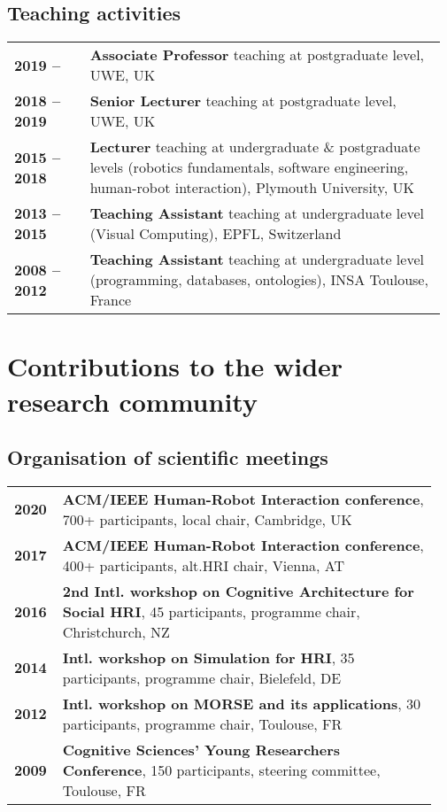 \subsection{Teaching activities}

\begin{tabular}{p{0.17\linewidth}p{0.8\linewidth}}
    \bf 2019 --  & \textbf{Associate Professor} teaching at postgraduate level, UWE, UK \\
    \bf 2018 -- 2019 & \textbf{Senior Lecturer} teaching at postgraduate level, UWE, UK \\
    \bf 2015 -- 2018 & \textbf{Lecturer} teaching at undergraduate \&
    postgraduate levels (robotics fundamentals, software engineering, human-robot interaction), Plymouth University, UK \\
    \bf 2013 -- 2015 & \textbf{Teaching Assistant} teaching at undergraduate level (Visual Computing), EPFL, Switzerland \\
    \bf 2008 -- 2012 & \textbf{Teaching Assistant} teaching at undergraduate level (programming, databases, ontologies), INSA Toulouse, France \\
\end{tabular}

\vspace{2em}
\section{Contributions to the wider research community}
\subsection{Organisation of scientific meetings}

\begin{tabular}{p{0.1\linewidth}p{0.85\linewidth}}
    \bf 2020 & \textbf{ACM/IEEE Human-Robot Interaction conference}, 700+ participants, local chair, Cambridge, UK \\
    \bf 2017 & \textbf{ACM/IEEE Human-Robot Interaction conference}, 400+
    participants, alt.HRI chair, Vienna, AT \\
    \bf 2016 & \textbf{2nd Intl. workshop on Cognitive Architecture for Social HRI}, 45 participants, programme chair, Christchurch, NZ \\
    \bf 2014 & \textbf{Intl. workshop on Simulation for HRI}, 35 participants, programme chair, Bielefeld, DE \\
    \bf 2012 & \textbf{Intl. workshop on MORSE and its applications}, 30 participants, programme chair, Toulouse, FR \\
    \bf 2009 & \textbf{Cognitive Sciences’ Young Researchers Conference}, 150 participants, steering committee, Toulouse, FR \\
\end{tabular}

